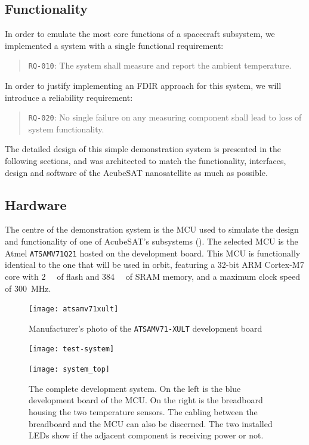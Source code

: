 \documentclass[a4paper,nobib,final]{tufte-book}
\begin{document}
\subsection{Functionality}
\label{sec:tsvcd}

In order to emulate the most core functions of a spacecraft subsystem, we implemented a system with a single functional requirement:
\begin{quote}
	\texttt{RQ-010}: The system shall measure and report the ambient temperature.
\end{quote}

In order to justify implementing an \ac{FDIR} approach for this system, we will introduce a reliability requirement:
\begin{quote}
	\texttt{RQ-020}: No single failure on any measuring component shall lead to loss of system functionality.
\end{quote}

The detailed design of this simple demonstration system is presented in the following sections, and was architected to match the functionality, interfaces, design and software of the AcubeSAT nanosatellite as much as possible.

\subsection{Hardware}

The centre of the demonstration system is the \ac{MCU} used to simulate the design and functionality of one of AcubeSAT's subsystems (). The selected \ac{MCU} is the Atmel \texttt{ATSAMV71Q21} hosted on the  development board. This \ac{MCU} is functionally identical to the one that will be used in orbit, featuring a 32-bit ARM Cortex-M7 core with \SI{2}{\mebi\byte} of flash and \SI{384}{\kibi\byte} of \acs{SRAM} memory, and a maximum clock speed of \SI{300}{\mega\hertz}.

\begin{figure}
	\centering
	\texttt{[image: atsamv71xult]}
	\caption{Manufacturer's photo of the \texttt{ATSAMV71-XULT} development board}
\end{figure}

\begin{figure}
	\texttt{[image: test-system]}\par
	\vspace*{3ex}
	\texttt{[image: system\_top]}
	\caption[The complete development system]{The complete development system. On the left is the blue development board of the \acs{MCU}. On the right is the breadboard housing the two temperature sensors. The cabling between the breadboard and the \acs{MCU} can also be discerned. The two installed \acsp{LED} show if the adjacent component is receiving power or not.}
\end{figure}
\end{document}
